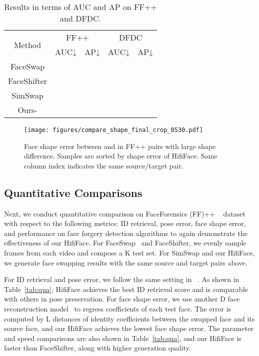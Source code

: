 \documentclass{article}
\begin{document}
\begin{table}[t]
\centering
\small
\begin{tabular}{ccccc}
\toprule
\multirow{2}{*}[-0.2em]{Method} & \multicolumn{2}{c}{FF++} & \multicolumn{2}{c}{DFDC}\\
\cmidrule(l{2pt}r{2pt}){2-3}
\cmidrule(l{2pt}r{2pt}){4-5}
& AUC↓ & AP↓ & AUC↓ & AP↓   \\
\midrule
FaceSwap      &   &  &  &       \\
FaceShifter   &   &  &  &      \\
SimSwap   &   &  &  &     \\
\midrule
Ours-     &   &  &  &      \\
\bottomrule
\end{tabular}
\vspace{-2mm}
\caption{Results in terms of AUC and AP on FF++ and DFDC.}
\label{tab:auc}
\end{table}

\begin{figure}[t] 
\begin{center} 
\texttt{[image: figures/compare\_shape\_final\_crop\_0530.pdf]} 
\end{center} 
\vspace{-2mm}
\caption{Face shape error between  and  in  FF++ pairs with large shape difference. Samples are sorted by shape error of HifiFace. Same column index indicates the same source/target pair.}
\label{compare_shape} 
\end{figure}

\subsection{Quantitative Comparisons}

Next, we conduct quantitative comparison on FaceForensics (FF)++ ~\cite{rossler2019faceforensics++} dataset with respect to the following metrics: ID retrieval, pose error, face shape error, and performance on face forgery detection algorithms to again demonstrate the effectiveness of our HifiFace. For FaceSwap~\cite{FaceSwap} and FaceShifter, we evenly sample  frames from each video and compose a K test set. For SimSwap and our HifiFace, we generate face swapping results with the same source and target pairs above. 

For ID retrieval and pose error, we follow the same setting in ~\cite{li2019faceshifter,chen2020simswap}. 
As shown in Table~\ref{tab:qua}, HifiFace achieves the best ID retrieval score and is comparable with others in pose preservation.
For face shape error, we use another D face reconstruction model~\cite{sanyal2019learning} to regress coefficients of each test face. The error is computed by L distances of identity coefficients between the swapped face and its source face, and our HifiFace achieves the lowest face shape error. 
The parameter and speed comparisons are also shown in Table~\ref{tab:qua}, and our HifiFace is faster than FaceShifter, along with higher generation quality. 
\end{document}
